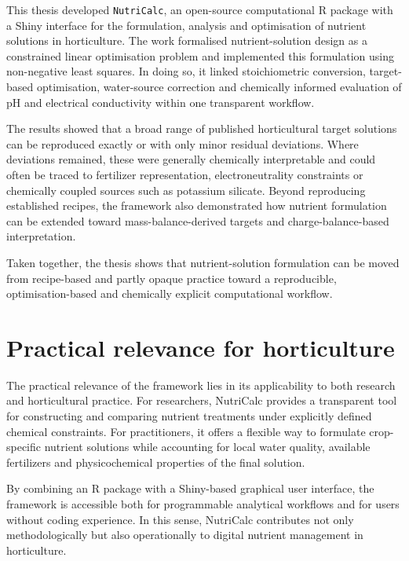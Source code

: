 \documentclass[
  letterpaper,
  DIV=11,
  numbers=noendperiod]{scrreprt}
\begin{document}
This thesis developed \texttt{NutriCalc}, an open-source computational R
package with a Shiny interface for the formulation, analysis and
optimisation of nutrient solutions in horticulture. The work formalised
nutrient-solution design as a constrained linear optimisation problem
and implemented this formulation using non-negative least squares. In
doing so, it linked stoichiometric conversion, target-based
optimisation, water-source correction and chemically informed evaluation
of pH and electrical conductivity within one transparent workflow.

The results showed that a broad range of published horticultural target
solutions can be reproduced exactly or with only minor residual
deviations. Where deviations remained, these were generally chemically
interpretable and could often be traced to fertilizer representation,
electroneutrality constraints or chemically coupled sources such as
potassium silicate. Beyond reproducing established recipes, the
framework also demonstrated how nutrient formulation can be extended
toward mass-balance-derived targets and charge-balance-based
interpretation.

Taken together, the thesis shows that nutrient-solution formulation can
be moved from recipe-based and partly opaque practice toward a
reproducible, optimisation-based and chemically explicit computational
workflow.

\section{Practical relevance for
horticulture}\label{practical-relevance-for-horticulture}

The practical relevance of the framework lies in its applicability to
both research and horticultural practice. For researchers, NutriCalc
provides a transparent tool for constructing and comparing nutrient
treatments under explicitly defined chemical constraints. For
practitioners, it offers a flexible way to formulate crop-specific
nutrient solutions while accounting for local water quality, available
fertilizers and physicochemical properties of the final solution.

By combining an R package with a Shiny-based graphical user interface,
the framework is accessible both for programmable analytical workflows
and for users without coding experience. In this sense, NutriCalc
contributes not only methodologically but also operationally to digital
nutrient management in horticulture.
\end{document}
